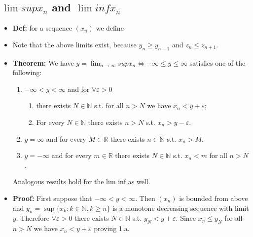 \documentclass{article}
\begin{document}
\subsection{\texorpdfstring{$\lim sup x_n$ and $\lim inf x_{n}$}{lim sup xn and lim inf xn}}
\begin{itemize}
    \item \textbf{Def:} for a sequence $(x_n)$ we define
    \item Note that the above limits exist, because $y_n \ge y_{n+1}$ and $z_n \le z_{n+1}$.
    \item \textbf{Theorem:} We have $\displaystyle y = \lim_{n\to\infty} sup x_n \iff -\infty \leq y \leq \infty$ satisfies one of the following: 
    \begin{enumerate}
        \item $-\infty < y < \infty$ and for $\forall \varepsilon > 0$
        \begin{enumerate}[label=(\alph*)]
            \item there exists $N \in \mathbb{N}$ s.t. for all $n > N$ we have $x_n < y + \varepsilon$; 
            \item For every $N \in \mathbb{N}$ there exists $n > N$ s.t. $x_n > y - \varepsilon$. 
        \end{enumerate}
        \item $y = \infty$ and for every $M \in \mathbb{R}$ there exists $n \in \mathbb{N}$ s.t. $x_n > M$. 
        \item $y = -\infty$ and for every $m \in \mathbb{R}$ there exists $N \in \mathbb{N}$ s.t. $x_n < m$ for all $n > N$. 
    \end{enumerate}
    Analogous results hold for the lim inf as well.
    \item \textbf{Proof:} First suppose that $-\infty < y < \infty$. Then $(x_n)$ is bounded from above and $y_n = \sup\{x_k: k \in \mathbb{N}, k \ge n\}$ is a monotone decreasing sequence with limit $y$. Therefore $\forall \varepsilon > 0$ there exists $N \in \mathbb{N}$ s.t. $y_N < y + \varepsilon$. Since $x_n \le y_N$ for all $n > N$ we have $x_n < y + \varepsilon$ proving 1.a. 
    

\end{itemize}
\end{document}
